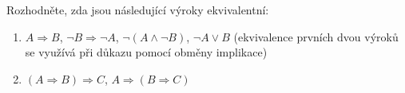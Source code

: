 Rozhodněte, zda jsou následující výroky ekvivalentní:

\begin{enumerate}

	\item  $A \Rightarrow B$, $\neg B \Rightarrow \neg A$, $\neg (A \wedge \neg B)$, $\neg A \vee B$ (ekvivalence prvních dvou výroků se využívá při důkazu pomocí obměny implikace)

	\item  $(A \Rightarrow B) \Rightarrow C$, $A \Rightarrow (B \Rightarrow C)$

\end{enumerate}

